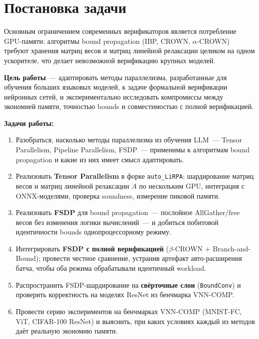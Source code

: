 \section{Постановка задачи}

Основным ограничением современных верификаторов является потребление
GPU-памяти: алгоритмы bound propagation (IBP, CROWN, $\alpha$-CROWN)
требуют хранения матриц весов и матриц линейной релаксации
целиком на одном ускорителе, что делает невозможной верификацию
крупных моделей.

\textbf{Цель работы}~--- адаптировать методы параллелизма,
разработанные для обучения больших языковых моделей, к задаче
формальной верификации нейронных сетей, и экспериментально
исследовать компромиссы между экономией памяти, точностью
bounds и совместимостью с полной верификацией.

\textbf{Задачи работы:}
\begin{enumerate}
    \item Разобраться, насколько методы параллелизма из обучения LLM~---
    Tensor Parallelism, Pipeline Parallelism, FSDP~--- применимы к
    алгоритмам bound propagation и какие из них имеет смысл адаптировать.

    \item Реализовать \textbf{Tensor Parallelism} в форке
    \texttt{auto\_LiRPA}: шардирование матриц весов и матриц
    линейной релаксации $A$ по нескольким GPU, интеграция
    с ONNX-моделями, проверка soundness, измерение пиковой памяти.

    \item Реализовать \textbf{FSDP} для bound propagation~---
    послойное AllGather/free весов без изменения логики вычислений~---
    и добиться побитовой идентичности bounds однопроцессорному режиму.

    \item Интегрировать \textbf{FSDP с полной верификацией}
    ($\beta$-CROWN + Branch-and-Bound); провести честное сравнение,
    устранив артефакт авто-расширения батча, чтобы оба режима
    обрабатывали идентичный workload.

    \item Распространить FSDP-шардирование на \textbf{свёрточные слои}
    (\texttt{BoundConv}) и проверить корректность на моделях ResNet
    из бенчмарка VNN-COMP.

    \item Провести серию экспериментов на бенчмарках VNN-COMP
    (MNIST-FC, ViT, CIFAR-100 ResNet) и выяснить, при каких условиях
    каждый из методов даёт реальную экономию памяти.
\end{enumerate}

